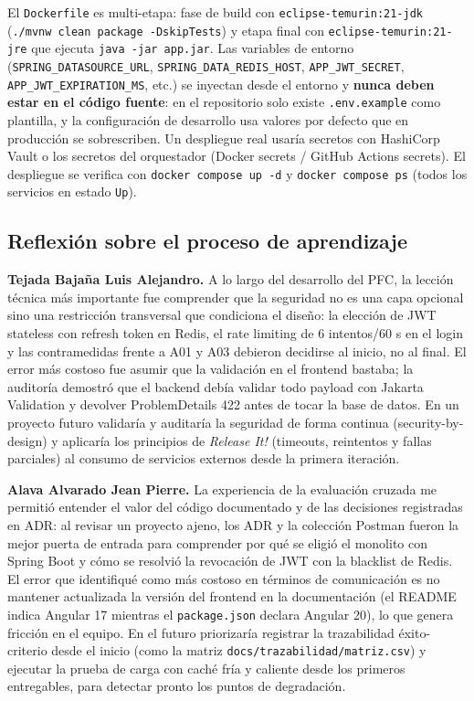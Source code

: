 El \texttt{Dockerfile} es multi-etapa: fase de build con \texttt{eclipse-temurin:21-jdk} (\texttt{./mvnw clean
package -DskipTests}) y etapa final con \texttt{eclipse-temurin:21-jre} que ejecuta \texttt{java -jar app.jar}. Las
variables de entorno (\texttt{SPRING\_DATASOURCE\_URL}, \texttt{SPRING\_DATA\_REDIS\_HOST},
\texttt{APP\_JWT\_SECRET}, \texttt{APP\_JWT\_EXPIRATION\_MS}, etc.) se inyectan desde el entorno y \textbf{nunca
deben estar en el código fuente}: en el repositorio solo existe \texttt{.env.example} como plantilla, y la
configuración de desarrollo usa valores por defecto que en producción se sobrescriben. Un despliegue real usaría
secretos con HashiCorp Vault o los secretos del orquestador (Docker secrets / GitHub Actions secrets). El
despliegue se verifica con \texttt{docker compose up -d} y \texttt{docker compose ps} (todos los servicios en
estado \texttt{Up}).

\subsection{Reflexión sobre el proceso de aprendizaje}

\textbf{Tejada Bajaña Luis Alejandro.} A lo largo del desarrollo del PFC, la lección técnica más importante fue
comprender que la seguridad no es una capa opcional sino una restricción transversal que condiciona el diseño: la
elección de JWT stateless con refresh token en Redis, el rate limiting de 6 intentos/60 s en el login y las
contramedidas frente a A01 y A03 debieron decidirse al inicio, no al final. El error más costoso fue asumir que la
validación en el frontend bastaba; la auditoría demostró que el backend debía validar todo payload con Jakarta
Validation y devolver ProblemDetails 422 antes de tocar la base de datos. En un proyecto futuro validaría y
auditaría la seguridad de forma continua (security-by-design) y aplicaría los principios de \textit{Release It!}
(timeouts, reintentos y fallas parciales) al consumo de servicios externos desde la primera iteración.

\textbf{Alava Alvarado Jean Pierre.} La experiencia de la evaluación cruzada me permitió entender el valor del
código documentado y de las decisiones registradas en ADR: al revisar un proyecto ajeno, los ADR y la colección
Postman fueron la mejor puerta de entrada para comprender por qué se eligió el monolito con Spring Boot y cómo se
resolvió la revocación de JWT con la blacklist de Redis. El error que identifiqué como más costoso en términos de
comunicación es no mantener actualizada la versión del frontend en la documentación (el README indica Angular 17
mientras el \texttt{package.json} declara Angular 20), lo que genera fricción en el equipo. En el futuro priorizaría
registrar la trazabilidad éxito-criterio desde el inicio (como la matriz \texttt{docs/trazabilidad/matriz.csv}) y
ejecutar la prueba de carga con caché fría y caliente desde los primeros entregables, para detectar pronto los
puntos de degradación.